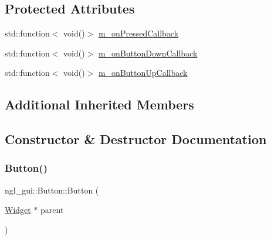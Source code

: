 \subsection*{Protected Attributes}
\begin{DoxyCompactItemize}
\item 
std\+::function$<$ void()$>$ \mbox{\hyperlink{classngl__gui_1_1_button_af090b33093b5b400f3f28e22f82d7fd2}{m\+\_\+on\+Pressed\+Callback}}
\item 
std\+::function$<$ void()$>$ \mbox{\hyperlink{classngl__gui_1_1_button_a87f1bdc19a384c649c0e299e8d0842a4}{m\+\_\+on\+Button\+Down\+Callback}}
\item 
std\+::function$<$ void()$>$ \mbox{\hyperlink{classngl__gui_1_1_button_a12f95fd476017194b064040fe071f4f7}{m\+\_\+on\+Button\+Up\+Callback}}
\end{DoxyCompactItemize}
\subsection*{Additional Inherited Members}


\subsection{Constructor \& Destructor Documentation}
\mbox{\label{classngl__gui_1_1_button_ac153b6ad7d4656c9a66699fe91fb0529}} 
\subsubsection{\texorpdfstring{Button()}{Button()}}
{\footnotesize\ttfamily ngl\+\_\+gui\+::\+Button\+::\+Button (\begin{DoxyParamCaption}\item[{\mbox{\hyperlink{classngl__gui_1_1_widget}{Widget}} $\ast$}]{parent }\end{DoxyParamCaption})\hspace{0.3cm}{\ttfamily [explicit]}}

\mbox{\label{classngl__gui_1_1_button_ae33e1e09f1f50ddc5f5820dbc90ff43f}} 
